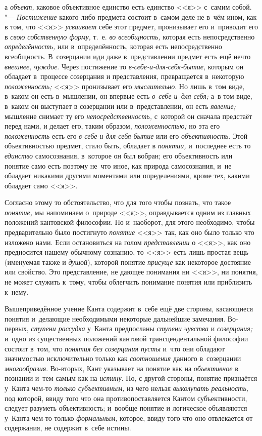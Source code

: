 а {\em объект,} каковое объективное единство есть единство <<я>> с~самим собой. "---
{\em Постижение} какого-либо предмета состоит в~самом деле не в~чём ином, как
в том, что <<я>> {\em усваивает} себе этот предмет, пронизывает его и~приводит его
в {\em свою собственную форму,} т.~е. {\em во всеобщность,} которая есть
непосредственно {\em определённость,} или в~определённость, которая есть
непосредственно всеобщность. В~созерцании иди даже в~представлении предмет
есть ещё нечто {\em внешнее, чуждое}. Через постижение то
{\em в-себе-и-для-себя-бытие,} которым он обладает в~процессе созерцания и
представления, превращается в~некоторую {\em положенность;} <<я>> пронизывает
его {\em мыслительно}. Но лишь в~том виде, в~каком он есть в~мышлении, он
впервые есть {\em в~себе и~для себя;} а~в том виде, в~каком он выступает в
созерцании или в~представлении, он есть {\em явление;} мышление снимает ту
его {\em непосредственность,} с~которой он сначала предстаёт перед нами, и
делает его, таким образом, {\em положенностью;} но эта его {\em положенность}
есть его {\em в-себе-и-для-себя-бытие} или его {\em объективность}. Этой
объективностью предмет, стало быть, обладает в {\em понятии,} и~последнее
есть то {\em единство} самосознания, в~которое он был вобран; его
объективность или понятие само есть поэтому не~что иное, как природа
самосознания, и~не обладает никакими другими моментами или определениями,
кроме тех, какими обладает само <<я>>.

Согласно этому то обстоятельство, что для того чтобы познать, что такое
{\em понятие,} мы напоминаем о~природе <<я>>, оправдывается одним из главных
положений кантовской философии. Но и~наоборот, для этого необходимо, чтобы
предварительно было постигнуто {\em понятие} <<я>> так, как оно было только что
изложено нами. Если остановиться на голом {\em представлении} о <<я>>, как оно
предносится нашему обычному сознанию, то <<я>> есть лишь простая вещь
(именуемая также и {\em душой}), которой понятие {\em присуще} как некоторое
достояние или свойство. Это представление, не дающее понимания ни <<я>>, ни
понятия, не может служить к~тому, чтобы облегчить понимание понятия или
приблизить к~нему.

Вышеприведённое учение Канта содержит в~себе ещё две стороны,
касающиеся понятия и~делающие необходимыми некоторые дальнейшие замечания.
Во-первых, {\em ступени рассудка} у~Канта предпосланы {\em ступени чувства} и
{\em созерцания;} и~одно из существенных положений кантовой трансцендентальной
философии состоит в~том, что {\em понятия без созерцания
пусты} и~что они обладают значимостью исключительно только
как {\em соотношения} данного в~созерцании {\em многообразия}.
Во-вторых, Кант указывает на понятие как на {\em объективное}
в познании и~тем самым как на {\em истину}. Но, с
другой стороны, понятие признаётся у~Канта чем-то {\em только субъективным,}
из чего нельзя {\em выколупать реальность,}
под которой, ввиду того что она противопоставляется Кантом
субъективности, следует разуметь объективность; и~вообще понятие и
логическое объявляются у~Канта чем-то только {\em формальным,} которое,
ввиду того что оно отвлекается от содержания, не содержит в~себе истины.

